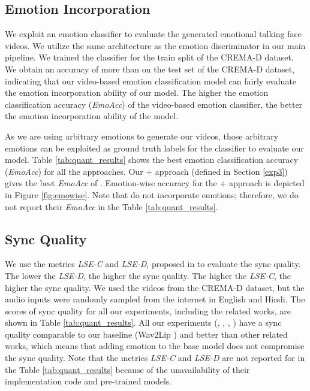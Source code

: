\documentclass[accepted]{uai2023}
\begin{document}
\subsection{Emotion Incorporation}
We exploit an emotion classifier to evaluate the generated emotional talking face videos. We utilize the same architecture as the emotion discriminator in our main pipeline. We trained the classifier for the train split of the CREMA-D \citep{cao2014crema} dataset. We obtain an accuracy of more than  on the test set of the CREMA-D dataset, indicating that our video-based emotion classification model can fairly evaluate the emotion incorporation ability of our model. The higher the emotion classification accuracy (\emph{EmoAcc}) of the video-based emotion classifier, the better the emotion incorporation ability of the model.

As we are using arbitrary emotions to generate our videos, those arbitrary emotions can be exploited as ground truth labels for the classifier to evaluate our model. Table \ref{tab:quant_results} shows the best emotion classification accuracy (\emph{EmoAcc}) for all the approaches. Our + approach (defined in Section \ref{exp3}) gives the best \emph{EmoAcc} of .
Emotion-wise accuracy for the + approach is depicted in Figure \ref{fig:emowise}. Note that \citep{prajwal2020lip, wang2021audio2head} do not incorporate emotions; therefore, we do not report their \emph{EmoAcc} in the Table \ref{tab:quant_results}.

\subsection{Sync Quality}
We use the metrics
\emph{LSE-C} and \emph{LSE-D}, proposed in \citep{prajwal2020lip} to evaluate the sync quality.
The lower the \emph{LSE-D}, the higher the sync quality. The higher the \emph{LSE-C}, the higher the sync quality.
We used the videos from the CREMA-D \citep{cao2014crema} dataset, but the audio inputs were randomly sampled from the internet in English and Hindi.
The scores of sync quality for all our experiments, including the related works, are shown in  Table \ref{tab:quant_results}. All our experiments ({}, {}, {}, {}) have a sync quality comparable to our baseline (Wav2Lip \citep{prajwal2020lip}) and better than other related works, which means that adding emotion to the base model does not compromise the sync quality. Note that the metrics \emph{LSE-C} and \emph{LSE-D} are not reported for \citep{DBLP:journals/corr/abs-1906-06337, sinha2022emotion} in the Table \ref{tab:quant_results} because of the unavailability of their implementation code and pre-trained models.
\end{document}
